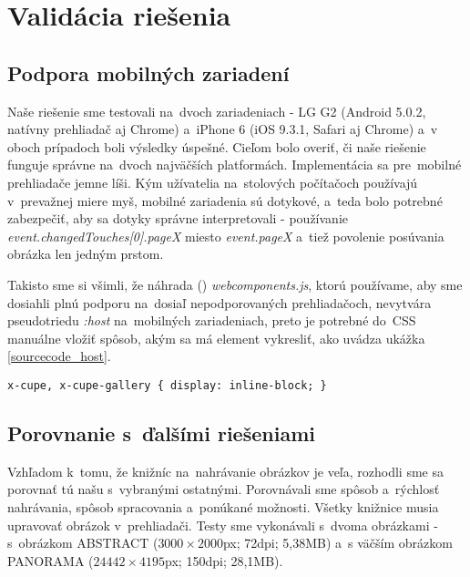 \chapter{Validácia riešenia}
\section{Podpora mobilných zariadení}

Naše riešenie sme testovali na~dvoch zariadeniach - LG G2 (Android 5.0.2, natívny prehliadač aj Chrome) a~iPhone 6 (iOS 9.3.1, Safari aj Chrome) a~v oboch prípadoch boli výsledky úspešné. Cieľom bolo overiť, či naše riešenie funguje správne na~dvoch najväčších platformách. Implementácia sa pre~mobilné prehliadače jemne líši. Kým užívatelia na~stolových počítačoch používajú v~prevažnej miere myš, mobilné zariadenia sú dotykové, a~teda bolo potrebné zabezpečiť, aby sa dotyky správne interpretovali - používanie \emph{event.changedTouches[0].pageX} miesto \emph{event.pageX} a~tiež povolenie posúvania obrázka len jedným prstom.

Takisto sme si všimli, že náhrada () \emph{webcomponents.js}, ktorú používame, aby sme dosiahli plnú podporu na~dosiaľ nepodporovaných prehliadačoch, nevytvára pseudotriedu \emph{:host} na~mobilných zariadeniach, preto je potrebné do~CSS manuálne vložiť spôsob, akým sa má element vykresliť, ako uvádza ukážka \ref{sourcecode_host}.

\begin{lstlisting}[label=sourcecode_host,caption=Štýly potrebné pre~správne fungovanie na~mobilných zariadeniach.]
x-cupe, x-cupe-gallery { display: inline-block; }
\end{lstlisting}

\section{Porovnanie s~ďalšími riešeniami}

Vzhľadom k~tomu, že knižníc na~nahrávanie obrázkov je veľa, rozhodli sme sa porovnať tú našu s~vybranými ostatnými. Porovnávali sme spôsob a~rýchlosť nahrávania, spôsob spracovania a~ponúkané možnosti. Všetky knižnice musia upravovať obrázok v~prehliadači.
Testy sme vykonávali s~dvoma obrázkami - s~obrázkom ABSTRACT ($3000\times2000$px; 72dpi; 5,38MB) a~s väčším obrázkom PANORAMA ($24442\times4195$px; 150dpi; 28,1MB).

